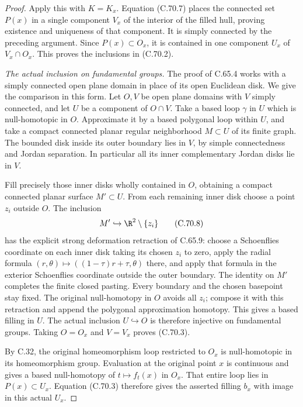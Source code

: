 \begin{proof}
Apply this with $K=K_x$. Equation (C.70.7) places the
connected set $P(x)$ in a single component $V_x$ of
the interior of the filled hull, proving existence and
uniqueness of that component. It is simply connected
by the preceding argument. Since $P(x)\subset O_x$,
it is contained in one component $U_x$ of $V_x\cap O_x$.
This proves the inclusions in (C.70.2).

\emph{The actual inclusion on fundamental groups.}
The proof of C.65.4 works with a simply connected open
plane domain in place of its open Euclidean disk. We give
the comparison in this form. Let $O,V$ be open plane
domains with $V$ simply connected, and let $U$ be a
component of $O\cap V$. Take a based loop $\gamma$ in
$U$ which is null-homotopic in $O$.
Approximate it by a based polygonal loop within $U$,
and take a compact connected planar regular neighborhood
$M\subset U$ of its finite graph. The bounded disk
inside its outer boundary lies in $V$, by simple
connectedness and Jordan separation. In particular all
its inner complementary Jordan disks lie in $V$.

Fill precisely those inner disks wholly contained in $O$,
obtaining a compact connected planar surface $M'\subset U$.
From each remaining inner disk choose a point $z_i$ outside
$O$. The inclusion
\[
                   M'\hookrightarrow\R^2\setminus\{z_i\}
                                                               \tag{C.70.8}
\]
has the explicit strong deformation retraction of C.65.9:
choose a Schoenflies coordinate on each inner disk taking
its chosen $z_i$ to zero, apply the radial formula
$(r,\theta)\mapsto((1-\tau)r+\tau,\theta)$ there, and
apply that formula in the exterior Schoenflies coordinate
outside the outer boundary. The identity on $M'$ completes
the finite closed pasting. Every boundary and the chosen
basepoint stay fixed.
The original null-homotopy in $O$ avoids all $z_i$;
compose it with this retraction and append the polygonal
approximation homotopy. This gives a based filling in $U$.
The actual inclusion $U\hookrightarrow O$ is therefore
injective on fundamental groups. Taking $O=O_x$ and
$V=V_x$ proves (C.70.3).

By C.32, the original homeomorphism loop restricted
to $O_x$ is null-homotopic in its homeomorphism group.
Evaluation at the original point $x$ is continuous and
gives a based null-homotopy of $t\mapsto f_t(x)$ in
$O_x$. That entire loop lies in $P(x)\subset U_x$.
Equation (C.70.3) therefore gives the asserted filling
$b_x$ with image in this actual $U_x$.


\end{proof}
